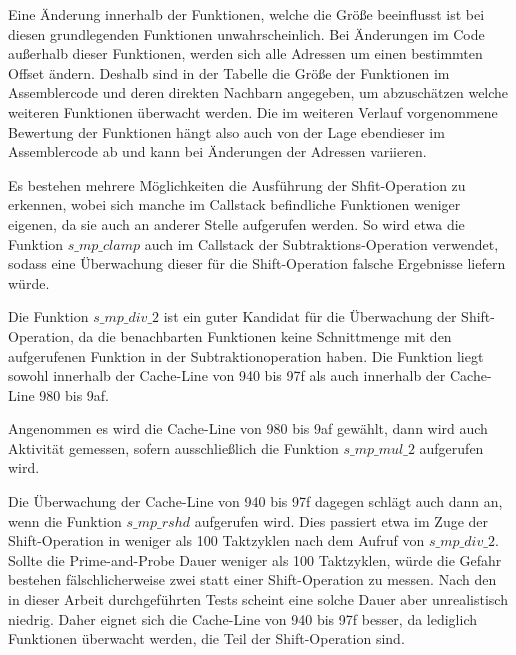 Eine Änderung innerhalb der Funktionen, welche die Größe beeinflusst ist bei diesen grundlegenden Funktionen unwahrscheinlich.
Bei Änderungen im Code außerhalb dieser Funktionen, werden sich alle Adressen um einen bestimmten Offset ändern.
Deshalb sind in der Tabelle die Größe der Funktionen im Assemblercode und deren direkten Nachbarn angegeben, um abzuschätzen welche weiteren Funktionen überwacht werden.
Die im weiteren Verlauf vorgenommene Bewertung der Funktionen hängt also auch von der Lage ebendieser im Assemblercode ab und kann bei Änderungen der Adressen variieren.

Es bestehen mehrere Möglichkeiten die Ausführung der Shfit-Operation zu erkennen, wobei sich manche im Callstack befindliche Funktionen weniger eigenen, da sie auch an anderer Stelle aufgerufen werden.
So wird etwa die Funktion $s\_mp\_clamp$ auch im Callstack der Subtraktions-Operation verwendet, sodass eine Überwachung dieser für die Shift-Operation falsche Ergebnisse liefern würde.

Die Funktion $s\_mp\_div\_2$ ist ein guter Kandidat für die Überwachung der Shift-Operation, da die benachbarten Funktionen keine Schnittmenge mit den aufgerufenen Funktion in der Subtraktionoperation haben.
Die Funktion liegt sowohl innerhalb der Cache-Line von 940 bis 97f als auch innerhalb der Cache-Line 980 bis 9af.

Angenommen es wird die Cache-Line von 980 bis 9af gewählt, dann wird auch Aktivität gemessen, sofern ausschließlich die Funktion $s\_mp\_mul\_2$ aufgerufen wird.

Die Überwachung der Cache-Line von 940 bis 97f dagegen schlägt auch dann an, wenn die Funktion $s\_mp\_rshd$ aufgerufen wird.
Dies passiert etwa im Zuge der Shift-Operation in weniger als 100 Taktzyklen nach dem Aufruf von $s\_mp\_div\_2$.
Sollte die Prime-and-Probe Dauer weniger als 100 Taktzyklen, würde die Gefahr bestehen fälschlicherweise zwei statt einer Shift-Operation zu messen.
Nach den in dieser Arbeit durchgeführten Tests scheint eine solche Dauer aber unrealistisch niedrig.
Daher eignet sich die Cache-Line von 940 bis 97f besser, da lediglich Funktionen überwacht werden, die Teil der Shift-Operation sind.


